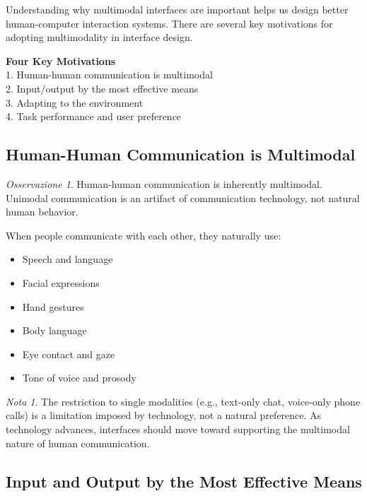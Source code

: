 \documentclass[11pt,a4paper]{article}
\theoremstyle{definition}
\theoremstyle{plain}
\theoremstyle{remark}
\newtheorem*{remark}{Nota}
\newtheorem*{observation}{Osservazione}
\begin{document}
Understanding why multimodal interfaces are important helps us design better human-computer interaction systems. There are several key motivations for adopting multimodality in interface design.

\begin{center}
\colorbox{red!15}{\parbox{0.9\textwidth}{
\centering
\textbf{Four Key Motivations}\\[0.2cm]
1. Human-human communication is multimodal\\
2. Input/output by the most effective means\\
3. Adapting to the environment\\
4. Task performance and user preference
}}
\end{center}

\subsection{Human-Human Communication is Multimodal}

\begin{observation}
Human-human communication is inherently multimodal. Unimodal communication is an artifact of communication technology, not natural human behavior.
\end{observation}

When people communicate with each other, they naturally use:
\begin{itemize}
    \item Speech and language
    \item Facial expressions
    \item Hand gestures
    \item Body language
    \item Eye contact and gaze
    \item Tone of voice and prosody
\end{itemize}

\begin{remark}
The restriction to single modalities (e.g., text-only chat, voice-only phone calls) is a limitation imposed by technology, not a natural preference. As technology advances, interfaces should move toward supporting the multimodal nature of human communication.
\end{remark}

\subsection{Input and Output by the Most Effective Means}
\end{document}
